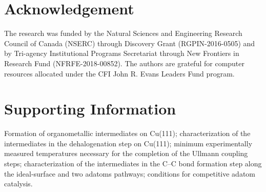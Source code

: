 \documentclass[aps,prb,amsmath,amssymb,11pt]{revtex4-1}
\newcommand*{\ACSNANO}{}
\newcommand{\sinfo}{Supporting Information}
\begin{document}
\ifdefined\ACSNANO



\fi

\section*{Acknowledgement}

The research was funded by the Natural Sciences and Engineering Research Council of Canada (NSERC) through Discovery Grant (RGPIN-2016-0505) and by Tri-agency Institutional Programs Secretariat through New Frontiers in Research Fund (NFRFE-2018-00852). The authors are grateful for computer resources allocated under the CFI John R. Evans Leaders Fund program.

\section*{\sinfo}

Formation of organometallic intermediates on Cu(111); characterization of the intermediates in the dehalogenation step on Cu(111); minimum experimentally measured temperatures necessary for the completion of the Ullmann coupling steps; characterization of the intermediates in the C--C bond formation step along the ideal-surface and two adatoms pathways; conditions for competitive adatom catalysis.



%
%







\pagebreak
\end{document}
